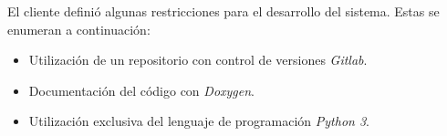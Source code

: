 El cliente definió algunas restricciones para el desarrollo del sistema.
Estas se enumeran a continuación:

\begin{itemize}
	\item Utilización de un repositorio con control de versiones \emph{Gitlab}.
	\item Documentación del código con \emph{Doxygen}.
	\item Utilización exclusiva del lenguaje de programación \emph{Python 3}.
\end{itemize}

